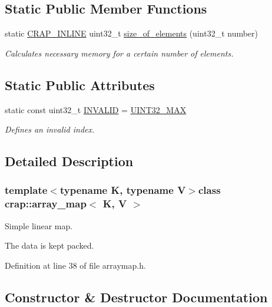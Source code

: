 \subsection*{Static Public Member Functions}
\begin{DoxyCompactItemize}
\item 
static \hyperlink{config__x86_8h_a5a40526b8d842e7ff731509998bb0f1c}{C\+R\+A\+P\+\_\+\+I\+N\+L\+I\+N\+E} uint32\+\_\+t \hyperlink{classcrap_1_1array__map_acbe6ebf74c40f5a5bb24299bd22b28d6}{size\+\_\+of\+\_\+elements} (uint32\+\_\+t number)
\begin{DoxyCompactList}\small\item\em Calculates necessary memory for a certain number of elements. \end{DoxyCompactList}\end{DoxyCompactItemize}
\subsection*{Static Public Attributes}
\begin{DoxyCompactItemize}
\item 
static const uint32\+\_\+t \hyperlink{classcrap_1_1array__map_af3441f93d975dab3aead6ba30e8ddf67}{I\+N\+V\+A\+L\+I\+D} = \hyperlink{crap__types_8h_ab5eb23180f7cc12b7d6c04a8ec067fdd}{U\+I\+N\+T32\+\_\+\+M\+A\+X}
\begin{DoxyCompactList}\small\item\em Defines an invalid index. \end{DoxyCompactList}\end{DoxyCompactItemize}


\subsection{Detailed Description}
\subsubsection*{template$<$typename K, typename V$>$class crap\+::array\+\_\+map$<$ K, V $>$}

Simple linear map. 

The data is kept packed. 

Definition at line 38 of file arraymap.\+h.



\subsection{Constructor \& Destructor Documentation}
\hypertarget{classcrap_1_1array__map_ad8452f8a9a16d043796b5348a7865801}{}
